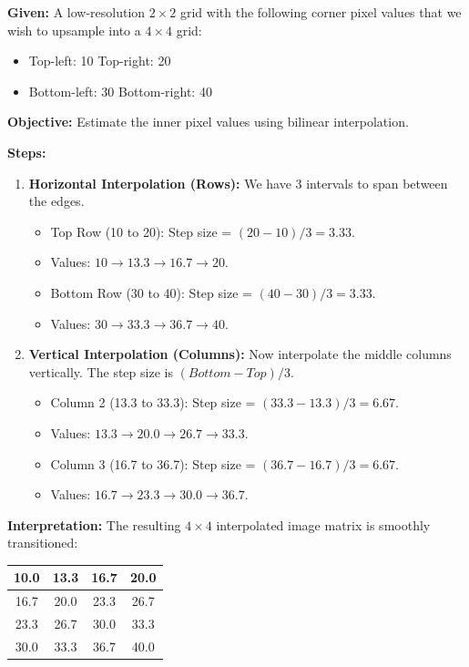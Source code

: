 \documentclass[11pt,a4paper]{article}
\begin{document}
\begin{tcolorbox}[colback=gray!5!white,colframe=black!75!black,title=\textbf{Numerical 1: Bilinear Interpolation (Upsampling)}]
\textbf{Given:}
A low-resolution $2 \times 2$ grid with the following corner pixel values that we wish to upsample into a $4 \times 4$ grid:
\begin{itemize}
    \item Top-left: 10 \quad Top-right: 20
    \item Bottom-left: 30 \quad Bottom-right: 40
\end{itemize}

\textbf{Objective:} Estimate the inner pixel values using bilinear interpolation.

\textbf{Steps:}
\begin{enumerate}
    \item \textbf{Horizontal Interpolation (Rows):} We have 3 intervals to span between the edges.
    \begin{itemize}
        \item Top Row (10 to 20): Step size = $(20 - 10) / 3 = 3.33$.
        \item Values: $10 \rightarrow 13.3 \rightarrow 16.7 \rightarrow 20$.
        \item Bottom Row (30 to 40): Step size = $(40 - 30) / 3 = 3.33$.
        \item Values: $30 \rightarrow 33.3 \rightarrow 36.7 \rightarrow 40$.
    \end{itemize}
    
    \item \textbf{Vertical Interpolation (Columns):} Now interpolate the middle columns vertically. The step size is $(Bottom - Top) / 3$.
    \begin{itemize}
        \item Column 2 (13.3 to 33.3): Step size = $(33.3 - 13.3) / 3 = 6.67$.
        \item Values: $13.3 \rightarrow 20.0 \rightarrow 26.7 \rightarrow 33.3$.
        \item Column 3 (16.7 to 36.7): Step size = $(36.7 - 16.7) / 3 = 6.67$.
        \item Values: $16.7 \rightarrow 23.3 \rightarrow 30.0 \rightarrow 36.7$.
    \end{itemize}
\end{enumerate}

\textbf{Interpretation:}
The resulting $4 \times 4$ interpolated image matrix is smoothly transitioned:
\begin{center}
\begin{tabular}{|c|c|c|c|}
\hline
10.0 & 13.3 & 16.7 & 20.0 \\ \hline
16.7 & 20.0 & 23.3 & 26.7 \\ \hline
23.3 & 26.7 & 30.0 & 33.3 \\ \hline
30.0 & 33.3 & 36.7 & 40.0 \\ \hline
\end{tabular}
\end{center}
\end{tcolorbox}
\end{document}
